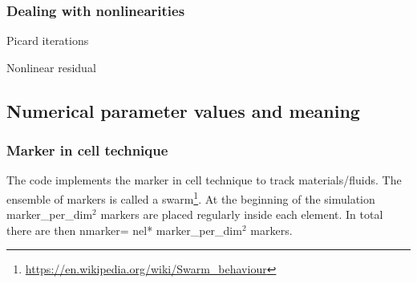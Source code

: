 \documentclass[a4paper]{article}
\newcommand{\python}{\color{darkgray} \sffamily }
\begin{document}
\subsubsection{Dealing with nonlinearities}

Picard iterations

Nonlinear residual


\subsection{Numerical parameter values and meaning}


\subsubsection{Marker in cell technique}

The code implements the marker in cell technique to track 
materials/fluids. The ensemble of markers is called a 
swarm\footnote{\url{https://en.wikipedia.org/wiki/Swarm_behaviour}}.
At the beginning of the simulation {\python marker\_per\_dim}$^2$
markers are placed regularly inside each element.
In total there are then {\python nmarker}={\python nel}*{\python marker\_per\_dim}$^2$
markers.
 
\end{document}
